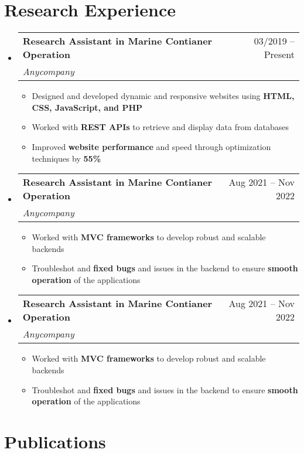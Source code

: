 \documentclass[a4paper,11pt]{article}
\makeatletter
\newcommand{\resumeItem}[1]{
  \item\small{#1}
}
\newcommand{\resumeItemListStart}{\begin{itemize}[rightmargin=0.11in]}
\newcommand{\resumeItemListEnd}{\end{itemize}}
\newcommand{\resumeQuadHeading}[4]{
  \item
  \begin{tabular*}{0.96\textwidth}[t]{l@{\extracolsep{\fill}}r}
    \textbf{#1} & #2 \\
    \textit{\small#3} & \textit{\small #4} \\
  \end{tabular*}
}
\newcommand{\resumeHeadingListStart}{
  \begin{itemize}[leftmargin=0.15in, label={}]
}
\newcommand{\resumeHeadingListEnd}{\end{itemize}}
\makeatother
\begin{document}

\section{Research Experience}
\resumeHeadingListStart{}
  \resumeQuadHeading{Research Assistant in Marine Contianer Operation}{03/2019 -- Present}
  {Anycompany}{}
    \resumeItemListStart{}
      \resumeItem{Designed and developed dynamic and responsive websites using \textbf{HTML, CSS, JavaScript, and PHP}}
      \resumeItem{Worked with \textbf{REST APIs} to retrieve and display data from databases}
      \resumeItem{Improved \textbf{website performance} and speed through optimization techniques by \textbf{55\%}}
    \resumeItemListEnd{}

  \resumeQuadHeading{Research Assistant in Marine Contianer Operation}{Aug 2021 -- Nov 2022}
  {Anycompany}{}
    \resumeItemListStart{}
      \resumeItem{Worked with \textbf{MVC frameworks} to develop robust and scalable backends}
      \resumeItem{Troubleshot and \textbf{fixed bugs} and issues in the backend to ensure \textbf{smooth operation} of the applications}
    \resumeItemListEnd{}

    \resumeQuadHeading{Research Assistant in Marine Contianer Operation}{Aug 2021 -- Nov 2022}
  {Anycompany}{}
    \resumeItemListStart{}
      \resumeItem{Worked with \textbf{MVC frameworks} to develop robust and scalable backends}
      \resumeItem{Troubleshot and \textbf{fixed bugs} and issues in the backend to ensure \textbf{smooth operation} of the applications}
    \resumeItemListEnd{}


\resumeHeadingListEnd{}


\section{Publications}
\end{document}

